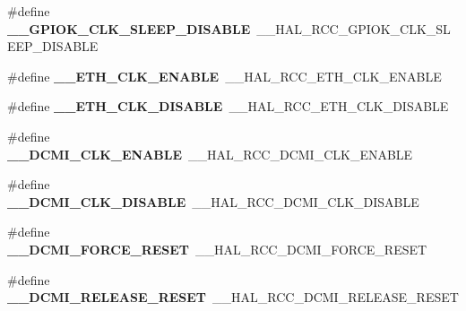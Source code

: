 \begin{DoxyCompactItemize}
\item 
\hypertarget{group___h_a_l___r_c_c___aliased_gac501e53a279698d854bf9767c7590777}{\#define {\bfseries \-\_\-\-\_\-\-G\-P\-I\-O\-K\-\_\-\-C\-L\-K\-\_\-\-S\-L\-E\-E\-P\-\_\-\-D\-I\-S\-A\-B\-L\-E}~\-\_\-\-\_\-\-H\-A\-L\-\_\-\-R\-C\-C\-\_\-\-G\-P\-I\-O\-K\-\_\-\-C\-L\-K\-\_\-\-S\-L\-E\-E\-P\-\_\-\-D\-I\-S\-A\-B\-L\-E}\label{group___h_a_l___r_c_c___aliased_gac501e53a279698d854bf9767c7590777}

\item 
\hypertarget{group___h_a_l___r_c_c___aliased_ga2e62d1334a35dec7840abd947e7c5e08}{\#define {\bfseries \-\_\-\-\_\-\-E\-T\-H\-\_\-\-C\-L\-K\-\_\-\-E\-N\-A\-B\-L\-E}~\-\_\-\-\_\-\-H\-A\-L\-\_\-\-R\-C\-C\-\_\-\-E\-T\-H\-\_\-\-C\-L\-K\-\_\-\-E\-N\-A\-B\-L\-E}\label{group___h_a_l___r_c_c___aliased_ga2e62d1334a35dec7840abd947e7c5e08}

\item 
\hypertarget{group___h_a_l___r_c_c___aliased_ga79a0882631a52ff9b86a89822122a41e}{\#define {\bfseries \-\_\-\-\_\-\-E\-T\-H\-\_\-\-C\-L\-K\-\_\-\-D\-I\-S\-A\-B\-L\-E}~\-\_\-\-\_\-\-H\-A\-L\-\_\-\-R\-C\-C\-\_\-\-E\-T\-H\-\_\-\-C\-L\-K\-\_\-\-D\-I\-S\-A\-B\-L\-E}\label{group___h_a_l___r_c_c___aliased_ga79a0882631a52ff9b86a89822122a41e}

\item 
\hypertarget{group___h_a_l___r_c_c___aliased_ga5d0a441280f3b8efaa24cb93242dcc3a}{\#define {\bfseries \-\_\-\-\_\-\-D\-C\-M\-I\-\_\-\-C\-L\-K\-\_\-\-E\-N\-A\-B\-L\-E}~\-\_\-\-\_\-\-H\-A\-L\-\_\-\-R\-C\-C\-\_\-\-D\-C\-M\-I\-\_\-\-C\-L\-K\-\_\-\-E\-N\-A\-B\-L\-E}\label{group___h_a_l___r_c_c___aliased_ga5d0a441280f3b8efaa24cb93242dcc3a}

\item 
\hypertarget{group___h_a_l___r_c_c___aliased_gacfebd1d5cc89592b9313e683e9a6c00a}{\#define {\bfseries \-\_\-\-\_\-\-D\-C\-M\-I\-\_\-\-C\-L\-K\-\_\-\-D\-I\-S\-A\-B\-L\-E}~\-\_\-\-\_\-\-H\-A\-L\-\_\-\-R\-C\-C\-\_\-\-D\-C\-M\-I\-\_\-\-C\-L\-K\-\_\-\-D\-I\-S\-A\-B\-L\-E}\label{group___h_a_l___r_c_c___aliased_gacfebd1d5cc89592b9313e683e9a6c00a}

\item 
\hypertarget{group___h_a_l___r_c_c___aliased_ga083e8a8aedb1087763c550f8e1fb55c3}{\#define {\bfseries \-\_\-\-\_\-\-D\-C\-M\-I\-\_\-\-F\-O\-R\-C\-E\-\_\-\-R\-E\-S\-E\-T}~\-\_\-\-\_\-\-H\-A\-L\-\_\-\-R\-C\-C\-\_\-\-D\-C\-M\-I\-\_\-\-F\-O\-R\-C\-E\-\_\-\-R\-E\-S\-E\-T}\label{group___h_a_l___r_c_c___aliased_ga083e8a8aedb1087763c550f8e1fb55c3}

\item 
\hypertarget{group___h_a_l___r_c_c___aliased_ga6b90a9b7940aa1bd160945c302c5bb09}{\#define {\bfseries \-\_\-\-\_\-\-D\-C\-M\-I\-\_\-\-R\-E\-L\-E\-A\-S\-E\-\_\-\-R\-E\-S\-E\-T}~\-\_\-\-\_\-\-H\-A\-L\-\_\-\-R\-C\-C\-\_\-\-D\-C\-M\-I\-\_\-\-R\-E\-L\-E\-A\-S\-E\-\_\-\-R\-E\-S\-E\-T}\label{group___h_a_l___r_c_c___aliased_ga6b90a9b7940aa1bd160945c302c5bb09}


\end{DoxyCompactItemize}
